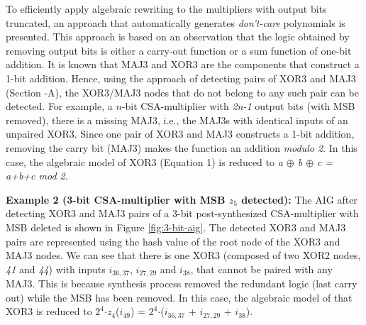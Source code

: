 
To efficiently apply algebraic rewriting to the multipliers with output bits truncated, an approach that automatically generates \textit{don't-care} polynomials is presented. This approach is based on an observation that the logic obtained by removing output bits is either a carry-out function or a sum function of one-bit addition. It is known that MAJ3 and XOR3 are the components that construct a 1-bit addition. Hence, using the approach of detecting pairs of XOR3 and MAJ3 (Section -A), the XOR3/MAJ3 nodes that do not belong to any such pair can be detected. For example, a $n$-bit CSA-multiplier with \textit{2n-1} output bits (with MSB removed), there is a missing MAJ3, i.e., the MAJ3s with identical inputs of an unpaired XOR3. Since one pair of XOR3 and MAJ3 constructs a 1-bit addition, removing the carry bit (MAJ3) makes the function an addition \textit{modulo 2}. In this case, the algebraic model of XOR3 (Equation 1) is reduced to \textit{a $\oplus$ b $\oplus$ c = a+b+c mod 2}. %

\textbf{Example 2 (3-bit CSA-multiplier with MSB $z_{5}$ detected):} The AIG after detecting XOR3 and MAJ3 pairs of a 3-bit post-synthesized CSA-multiplier with MSB deleted is shown in Figure \ref{fig:3-bit-aig}. The detected XOR3 and MAJ3 pairs are represented using the hash value of the root node of the XOR3 and MAJ3 nodes. We can see that there is one XOR3 (composed of two XOR2 nodes, \textit{41} and \textit{44}) with inputs $i_{36,37}$, $i_{27,29}$ and $i_{38}$, that cannot be paired with any MAJ3. This is because synthesis process removed the redundant logic (last carry out) while the MSB has been removed. In this case, the algebraic model of that XOR3 is reduced to $2^{4}$$\cdot$$z_{4}$($i_{49}$) = $2^4$$\cdot$($i_{36,37}$ + $i_{27,29}$ + $i_{38}$).



